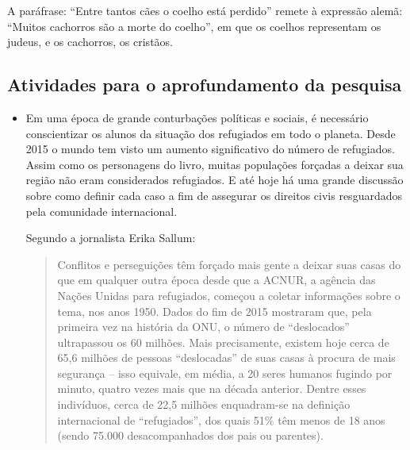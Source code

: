 \documentclass[12pt]{extarticle}
\begin{document}
A paráfrase: ``Entre tantos cães o coelho está perdido'' remete à
expressão alemã: ``Muitos cachorros são a morte do coelho'', em que os
coelhos representam os judeus, e os cachorros, os cristãos.

\subsection{Atividades para o aprofundamento da pesquisa}



\begin{itemize}

\subsubsection{Pesquisa e documentário sobre a situação dos refugiados}

\item 
Em uma época de grande conturbações políticas e sociais, 
é necessário conscientizar os alunos da situação dos refugiados 
em todo o planeta. Desde 2015 o mundo tem visto um aumento 
significativo do número de refugiados. Assim como os personagens 
do livro, muitas populações forçadas a deixar sua região não eram considerados 
refugiados. E até hoje há uma grande discussão sobre como definir
cada caso a fim de assegurar os direitos civis resguardados pela 
comunidade internacional. 

Segundo a jornalista Erika Sallum:

\begin{quote}
Conflitos e perseguições têm forçado mais gente a deixar suas casas do
que em qualquer outra época desde que a {ACNUR}, a agência das Nações
Unidas para refugiados, começou a coletar informações sobre o tema, nos
anos 1950. Dados do fim de 2015 mostraram que, pela primeira vez na
história da {ONU}, o número de ``deslocados'' ultrapassou os 60 milhões.
Mais precisamente, existem hoje cerca de 65,6 milhões de pessoas
``deslocadas'' de suas casas à procura de mais segurança -- isso
equivale, em média, a 20 seres humanos fugindo por minuto, quatro vezes
mais que na década anterior. Dentre esses indivíduos, cerca de 22,5 
milhões enquadram-se na definição internacional de ``refugiados'', dos
quais 51\% têm menos de 18 anos (sendo 75.000 desacompanhados dos pais
ou parentes).


\end{quote}
\end{itemize}
\end{document}
